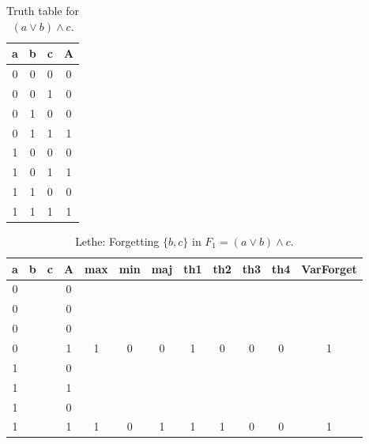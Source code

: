 \begin{table}[!tb]
    \centering
    \begin{tabular}{|c|c|c|c|}
        \hline
        \textbf{a} & \textbf{b} & \textbf{c} & \textbf{A} \\ \hline
        0 & 0 & 0 & 0 \\ \hline
        0 & 0 & 1 & 0 \\ \hline
        0 & 1 & 0 & 0 \\ \hline
        0 & 1 & 1 & 1 \\ \hline
        1 & 0 & 0 & 0 \\ \hline
        1 & 0 & 1 & 1 \\ \hline
        1 & 1 & 0 & 0 \\ \hline
        1 & 1 & 1 & 1 \\ \hline
    \end{tabular}
    \caption{Truth table for $(a \lor b) \land c$.}
    \label{tab:truthtab}
\end{table}

\begin{table}[!tb]
    \centering
    \begin{tabular}{|c|c|c|c|c|c|c|c|c|c|c|c|}
        \hline
        \textbf{a} & \textbf{b} & \textbf{c} & \textbf{A} & \textbf{max} & \textbf{min} & \textbf{maj} & \textbf{th1} & \textbf{th2} & \textbf{th3} & \textbf{th4} & \textbf{VarForget} \\ \hline
        \rowcolor{gray!40} 0 &  &  & 0 &  &  &  &  &  &  &  &  \\ \hline
        \rowcolor{gray!40} 0 &  &  & 0 &  &  &  &  &  &  &  &  \\ \hline
        \rowcolor{gray!40} 0 &  &  & 0 &  &  &  &  &  &  &  &  \\ \hline
        \rowcolor{gray!40} 0 &  &  & 1 & 1 & 0 & 0 & 1 & 0 & 0 & 0 & 1 \\ \hline
        \rowcolor{blue!40} 1 &  &  & 0 &  &  &  &  &  &  &  &  \\ \hline
        \rowcolor{blue!40} 1 &  &  & 1 &  &  &  &  &  &  &  &  \\ \hline
        \rowcolor{blue!40} 1 &  &  & 0 &  &  &  &  &  &  &  &  \\ \hline
        \rowcolor{blue!40} 1 &  &  & 1 & 1 & 0 & 1 & 1 & 1 & 0 & 0 & 1 \\ \hline
    \end{tabular}
    \caption{Lethe: Forgetting $\{b, c\}$ in $F_{1} = (a \lor b) \land c$.}
    \label{tab:lethe-F1-bc}
\end{table}
